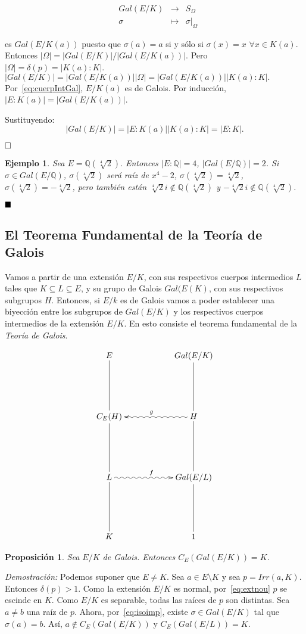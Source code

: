 \documentclass[12pt]{article}
\newtheorem{proposition}[theorem]{Proposición}
\newtheorem{example}{Ejemplo}[theorem]
\begin{document}
$$\begin{array}{rccl}
&Gal(E/K)&\longrightarrow &S_{\Omega} \\
&\sigma& \longmapsto &\left.\sigma \right|_\Omega 
\end{array}
$$

es $Gal(E/K(a))$ puesto que $\sigma(a) = a$ si y sólo si $\sigma (x) = x$ \hspace{0.1cm} $\forall x \in K(a)$. Entonces $|\Omega| = |Gal(E/K)|/|Gal(E/K(a))|$. Pero $|\Omega| = \delta(p) = |K(a):K|$. $|Gal(E/K)| = |Gal(E/K(a))| |\Omega| = |Gal(E/K(a))||K(a):K|.$ Por~\ref{eq:cuerpIntGal}, $E/K(a)$ es de Galois. Por inducción, $|E:K(a)| = |Gal(E/K(a))|$. 

Sustituyendo: $$|Gal(E/K)| = |E:K(a)| |K(a):K| = |E:K|.$$ 


$\hfill \square$

\begin{example}Sea $E = \mathbb{Q}(\sqrt[4]{2}).$ Entonces $|E:\mathbb{Q}| = 4$, $|Gal(E/\mathbb{Q})| = 2$. Si $\sigma \in Gal(E/\mathbb{Q})$, $\sigma(\sqrt[4]{2})$ será raíz de $x^4-2$, $\sigma(\sqrt[4]{2}) = \sqrt[4]{2}$, $\sigma(\sqrt[4]{2}) = -\sqrt[4]{2}$, pero también están $\sqrt[4]{2}i \notin \mathbb{Q}(\sqrt[4]{2})$ y $-\sqrt[4]{2}i \notin \mathbb{Q}(\sqrt[4]{2})$.
\end{example}

$\hfill \blacksquare$

\subsection{El Teorema Fundamental de la Teoría de Galois}

Vamos a partir de una extensión $E/K$, con sus respectivos cuerpos intermedios $L$ tales que $K \subseteq L \subseteq E$, y su grupo de Galois $Gal(E(K)$, con sus respectivos subgrupos $H$. Entonces, si $E/k$ es de Galois vamos a poder establecer una biyección entre los subgrupos de $Gal(E/K)$ y los respectivos cuerpos intermedios de la extensión $E/K$. En esto consiste el teorema fundamental de la \textit{Teoría de Galois}.

$$\xymatrix @=2cm {E & Gal(E/K) \\ C_{E}(H)\ar@{-}[u] &H\ar@{-}[u] \ar@{~>}[l]_g\\ L\ar@{-}[u] \ar@{~>}[r]^f &Gal(E/L)\ar@{-}[u] \\ K \ar@{-}[u] & 1 \ar@{-}[u]  }$$

\begin{proposition}\label{eq:preGal1} Sea $E/K$ de Galois. Entonces $C_{E}(Gal(E/K)) = K$.
\end{proposition}
\emph{Demostración: }Podemos suponer que $E\neq K$. Sea $a \in E \setminus K$ y sea $p = Irr(a,K)$. Entonces $\delta(p) >1$. Como la extensión $E/K$ es normal, por~\ref{eq:extnou} $p$ se escinde en $K$. Como $E/K$ es separable, todas las raíces de $p$ son distintas. Sea $a \neq b$ una raíz de $p$. Ahora, por~\ref{eq:isoimp}, existe $\sigma \in Gal(E/K)$ tal que $\sigma(a)=b$. Así, $a \notin C_{E}(Gal(E/K))$ y $C_{E}(Gal(E/L))=K.$
\end{document}

